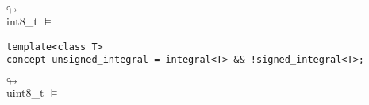 \begin{nscenter}
 $\looparrowright$  \\
int8\_t $\models$   
\end{nscenter}

\begin{lstlisting}
template<class T>
concept unsigned_integral = integral<T> && !signed_integral<T>;
\end{lstlisting}

\begin{nscenter}
 $\looparrowright$  \\
uint8\_t $\models$   
\end{nscenter}




\begin{comment}

{\color{plotptcolor}
\vspace{1in}

\hrule
\vspace{1mm}
\hrule

\fancybreak{$\blacktriangle\blacktriangle\blacktriangle$}
\begin{hindi}
\centering \bfseries\large 
ॐ 
\end{hindi}
\fancybreak{$\blacktriangledown\blacktriangledown\blacktriangledown$}

\hrule
\vspace{1mm}
\hrule}
\end{comment}




